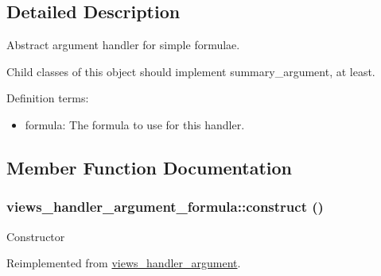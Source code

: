 \subsection{Detailed Description}
Abstract argument handler for simple formulae.

Child classes of this object should implement summary\_\-argument, at least.

Definition terms:\begin{itemize}
\item formula: The formula to use for this handler. \end{itemize}


\subsection{Member Function Documentation}
\hypertarget{classviews__handler__argument__formula_01284402427de2bcfa1b1da5792a2332}{
\subsubsection[{construct}]{\setlength{\rightskip}{0pt plus 5cm}views\_\-handler\_\-argument\_\-formula::construct ()}}
\label{classviews__handler__argument__formula_01284402427de2bcfa1b1da5792a2332}


Constructor 

Reimplemented from \hyperlink{classviews__handler__argument_93594a31e95e1a14cead4f038d7b321b}{views\_\-handler\_\-argument}.

